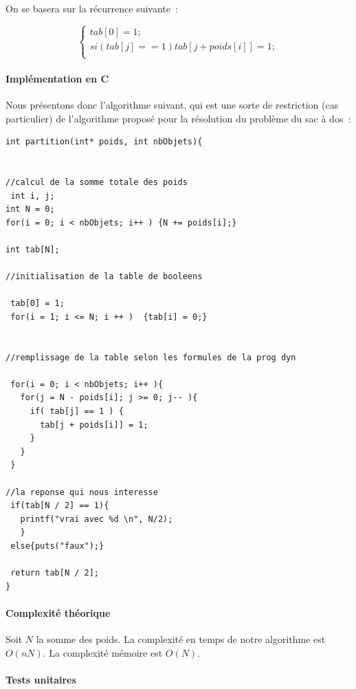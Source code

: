 \documentclass[a4paper, 12pt]{article}
\begin{document}
On se basera sur la récurrence suivante~:

\begin{equation}
\begin{cases}
tab[0] = 1; \\
si ( tab[j] == 1 ) {
       tab[j + poids[i]] = 1;
     } \\
\end{cases}
\end{equation}

\paragraph{Implémentation en C}

Nous présentons donc l'algorithme suivant, qui est une sorte de
restriction (cas particulier) de l'algorithme proposé pour la
résolution du problème du sac à dos~:

\begin{lstlisting}
int partition(int* poids, int nbObjets){ 


//calcul de la somme totale des poids
 int i, j;
int N = 0;
for(i = 0; i < nbObjets; i++ ) {N += poids[i];}

int tab[N]; 

//initialisation de la table de booleens

 tab[0] = 1;
 for(i = 1; i <= N; i ++ )  {tab[i] = 0;}


//remplissage de la table selon les formules de la prog dyn

 for(i = 0; i < nbObjets; i++ ){
   for(j = N - poids[i]; j >= 0; j-- ){
     if( tab[j] == 1 ) {
       tab[j + poids[i]] = 1;
     }
   }
 }

//la reponse qui nous interesse
 if(tab[N / 2] == 1){ 
   printf("vrai avec %d \n", N/2);
   }
 else{puts("faux");}

 return tab[N / 2];
}

\end{lstlisting}

\paragraph{Complexité théorique}

Soit $N$ la somme des poids.
La complexité en temps de notre algorithme est $O(nN)$.
La complexité mémoire est $O(N).$

\paragraph{Tests unitaires}
\end{document}
